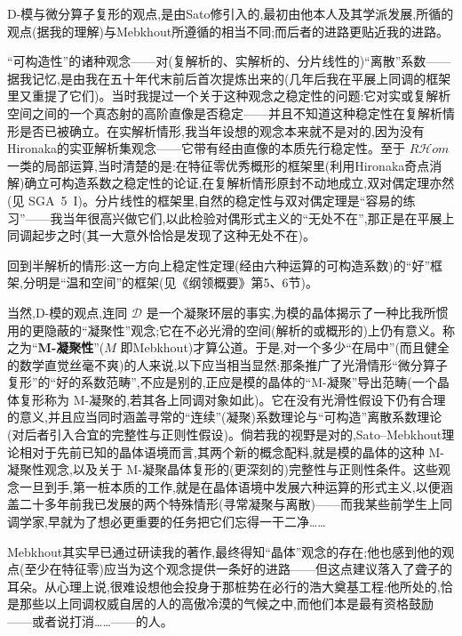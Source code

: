 
D-模与微分算子复形的观点,是由Sato修引入的,最初由他本人及其学派发展,所循的\dmark{}观点(据我的理解)与Mebkhout所遵循的相当不同;而后者的进路更贴近我的进路。

“可构造性”的诸种观念——对(复解析的、实解析的、分片线性的)“离散”系数——据我记忆,是由我在五十年代末前后首次提炼出来的(几年后我在平展上同调的框架里又重提了它们)。当时我提过一个关于这种观念之稳定性的问题:它对实或复解析空间之间的一个真态射的高阶直像是否稳定——并且不知道这种稳定性在复解析情形是否已被确立。在实解析情形,我当年设想的观念本来就不是对的,因为没有Hironaka的实亚解析集观念——它带有经由直像的本质先行稳定性。至于 $R\mathcal{H}om$ 一类的局部运算,当时清楚的是:在特征零优秀概形的框架里(利用Hironaka奇点消解)确立可构造系数之稳定性的论证,在复解析情形原封不动地成立,双对偶定理亦然(见 SGA~5~I)。分片线性的框架里,自然的稳定性与双对偶定理是“容易的练习”——我当年很高兴做它们,以此检验对偶形式主义的“无处不在”,那正是在平展上同调起步之时(其一大意外恰恰是发现了这种无处不在)。

回到半解析的情形:这一方向上稳定性定理(经由六种运算的可构造系数)的“好”框架,分明是“温和空间”的框架(见《纲领概要》第5、6节)。


当然,D-模的观点,连同 $\mathcal{D}$ 是一个凝聚环层的事实,为模的晶体揭示了一种比我所惯用的更隐蔽的“凝聚性”观念;它在不必光滑的空间(解析的或概形的)上仍有意义。称之为“\textbf{M-凝聚性}”($M$ 即Mebkhout)才算公道。于是,对一个多少“在局中”(而且健全的数学直觉丝毫不爽)的人来说,以下应当相当显然:那条推广了光滑情形“微分算子复形”的\dmark{}“好的系数范畴”,不应是别的,正应是模的晶体的“M-凝聚”导出范畴(一个晶体复形称为 M-凝聚的,若其各上同调对象如此)。它在没有光滑性假设下仍有合理的意义,并且应当同时涵盖寻常的“连续”(凝聚)系数理论与“可构造”离散系数理论(对后者引入合宜的完整性与正则性假设)。倘若我的视野是对的,Sato--Mebkhout理论相对于先前已知的晶体语境而言,其两个新的概念配料,就是模的晶体的这种 M-凝聚性观念,以及关于 M-凝聚晶体复形的(更深刻的)完整性与正则性条件。这些观念一旦到手,第一桩本质的工作,就是在晶体语境中发展六种运算的形式主义,以便涵盖二十多年前我已发展的两个特殊情形(寻常凝聚与离散)——而我某些前学生上同调学家,早就为了想必更重要的任务把它们忘得一干二净……

Mebkhout其实早已通过研读我的著作,最终得知“晶体”观念的存在;他也感到他的观点(至少在特征零)应当为这个观念提供一条好的进路——但这点建议落入了聋子的耳朵。从心理上说,很难设想他会投身于那桩势在必行的浩大奠基工程:他所处的,恰是那些以上同调权威自居的人的高傲冷漠的气候之中,而他们本是最有资格鼓励——或者说打消……——的人。

